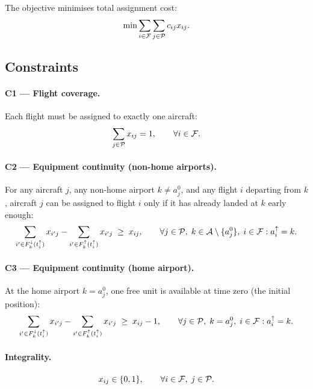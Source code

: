 The objective minimises total assignment cost:
\begin{equation}\label{eq:obj}
  \min \sum_{i \in \mathcal{F}} \sum_{j \in \mathcal{P}} c_{ij} x_{ij}.
\end{equation}

\subsection{Constraints}

\paragraph{C1 — Flight coverage.}
Each flight must be assigned to exactly one aircraft:
\begin{equation}\label{eq:c1}
  \sum_{j \in \mathcal{P}} x_{ij} = 1, \qquad \forall i \in \mathcal{F}.
\end{equation}

\paragraph{C2 — Equipment continuity (non-home airports).}
For any aircraft $j$, any non-home airport $k \ne a^0_j$, and any flight
$i$ departing from $k$, aircraft $j$ can be assigned to flight $i$ only if
it has already landed at $k$ early enough:
\begin{equation}\label{eq:c2}
  \sum_{i' \in F^{\downarrow}_{k}(t^{\uparrow}_{i})} x_{i'j}
  - \sum_{i' \in F^{\uparrow}_{k}(t^{\uparrow}_{i})} x_{i'j}
  \;\geq\; x_{ij},
  \qquad \forall j \in \mathcal{P},\; k \in \mathcal{A} \setminus \{a^0_j\},\;
  i \in \mathcal{F} : a^{\uparrow}_{i}=k.
\end{equation}

\paragraph{C3 — Equipment continuity (home airport).}
At the home airport $k = a^0_j$, one free unit is available at time zero
(the initial position):
\begin{equation}\label{eq:c3}
  \sum_{i' \in F^{\downarrow}_{k}(t^{\uparrow}_{i})} x_{i'j}
  - \sum_{i' \in F^{\uparrow}_{k}(t^{\uparrow}_{i})} x_{i'j}
  \;\geq\; x_{ij}-1,
  \qquad \forall j \in \mathcal{P},\; k = a^0_j,\;
  i \in \mathcal{F} : a^{\uparrow}_{i}=k.
\end{equation}

\paragraph{Integrality.}
\begin{equation}\label{eq:int}
  x_{ij} \in \{0, 1\}, \qquad \forall i \in \mathcal{F},\; j \in \mathcal{P}.
\end{equation}

